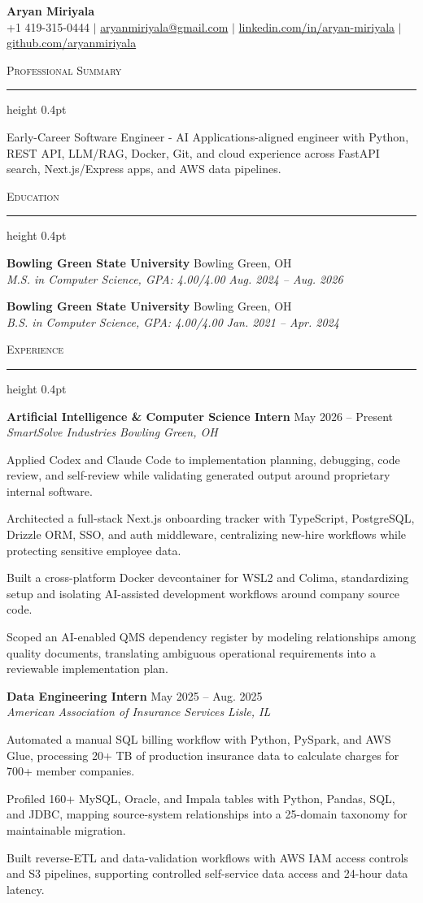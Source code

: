 \documentclass[letterpaper,11pt]{article}
\newcommand{\resumesection}[1]{%
  \par\vspace{2pt}%
  {\large\scshape #1}\par\vspace{2pt}%
  \hrule height 0.4pt\vspace{2pt}%
}
\newcommand{\resumeSubheading}[4]{
  \textbf{#1} \hfill #2\\
  \textit{#3} \hfill \textit{#4}
}
\begin{document}
\begin{center}
  {\LARGE \textbf{Aryan Miriyala}}\\[-1pt]
  \small
  +1 419-315-0444 $|$
  \href{mailto:aryanmiriyala@gmail.com}{aryanmiriyala@gmail.com} $|$
  \href{https://www.linkedin.com/in/aryan-miriyala-7788a21b6/}{linkedin.com/in/aryan-miriyala} $|$
  \href{https://github.com/aryanmiriyala}{github.com/aryanmiriyala}
\end{center}\vspace{-10pt}

\resumesection{Professional Summary}
Early-Career Software Engineer - AI Applications-aligned engineer with Python, REST API, LLM/RAG, Docker, Git, and cloud experience across FastAPI search, Next.js/Express apps, and AWS data pipelines.

\resumesection{Education}
\resumeSubheading
{Bowling Green State University}{Bowling Green, OH}
{M.S. in Computer Science, GPA: 4.00/4.00}{Aug. 2024 -- Aug. 2026}

\resumeSubheading
{Bowling Green State University}{Bowling Green, OH}
{B.S. in Computer Science, GPA: 4.00/4.00}{Jan. 2021 -- Apr. 2024}

\resumesection{Experience}
\resumeSubheading
{Artificial Intelligence \& Computer Science Intern}{May 2026 -- Present}
{SmartSolve Industries}{Bowling Green, OH}
\begin{tightitemize}
  \item Applied Codex and Claude Code to implementation planning, debugging, code review, and self-review while validating generated output around proprietary internal software.
  \item Architected a full-stack Next.js onboarding tracker with TypeScript, PostgreSQL, Drizzle ORM, SSO, and auth middleware, centralizing new-hire workflows while protecting sensitive employee data.
  \item Built a cross-platform Docker devcontainer for WSL2 and Colima, standardizing setup and isolating AI-assisted development workflows around company source code.
  \item Scoped an AI-enabled QMS dependency register by modeling relationships among quality documents, translating ambiguous operational requirements into a reviewable implementation plan.
\end{tightitemize}

\resumeSubheading
{Data Engineering Intern}{May 2025 -- Aug. 2025}
{American Association of Insurance Services}{Lisle, IL}
\begin{tightitemize}
  \item Automated a manual SQL billing workflow with Python, PySpark, and AWS Glue, processing 20+ TB of production insurance data to calculate charges for 700+ member companies.
  \item Profiled 160+ MySQL, Oracle, and Impala tables with Python, Pandas, SQL, and JDBC, mapping source-system relationships into a 25-domain taxonomy for maintainable migration.
  \item Built reverse-ETL and data-validation workflows with AWS IAM access controls and S3 pipelines, supporting controlled self-service data access and 24-hour data latency.
\end{tightitemize}
\end{document}

